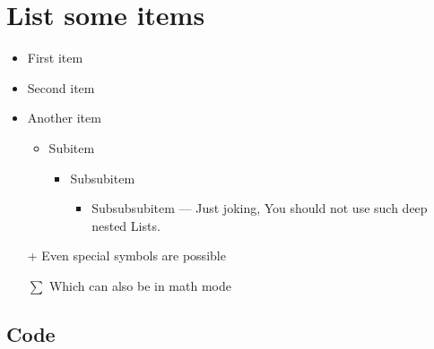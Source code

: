\section{List some items}
\begin{itemize}
    \item First item
    \item Second item
    \item Another item
    \begin{itemize}
        \item Subitem
        \begin{itemize}
            \item Subsubitem
            \begin{itemize}
                \item Subsubsubitem --- Just joking, You should not use such 
                    deep nested Lists.
            \end{itemize}
        \end{itemize}
    \end{itemize}
    \item[+] Even special symbols are possible
    \item[$\sum$] Which can also be in math mode
\end{itemize}

\subsection{Code}

